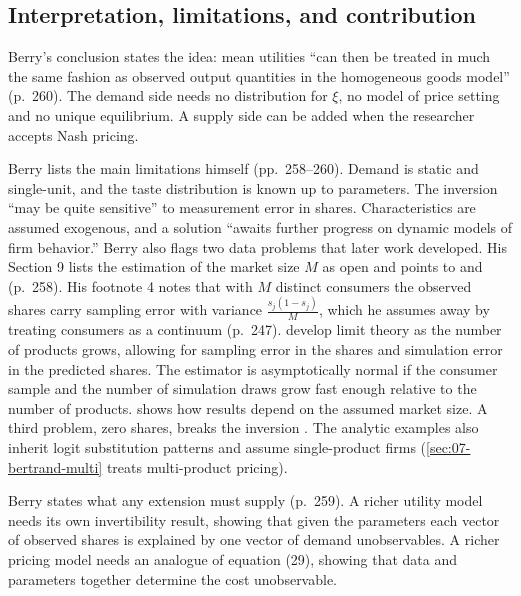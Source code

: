 \subsection{Interpretation, limitations, and contribution}\label{sec:07-berry-assessment}

Berry's conclusion states the idea: mean utilities ``can then be treated in much the same fashion as observed
output quantities in the homogeneous goods model'' (p.~260). The demand side needs no distribution for $\xi$, no
model of price setting and no unique equilibrium. A supply side can be added when the researcher accepts Nash
pricing.

Berry lists the main limitations himself (pp.~258--260). Demand is static and single-unit, and the taste
distribution is known up to parameters. The inversion ``may be quite sensitive'' to measurement error in shares.
Characteristics are assumed exogenous, and a solution ``awaits further progress on dynamic models of firm
behavior.'' Berry also flags two data problems that later work developed. His Section 9 lists the estimation of the
market size $M$ as open and points to \citet{Berry1990} and \citet{Greenstein1992} (p.~258). His footnote 4 notes
that with $M$ distinct consumers the observed shares carry sampling error with variance $\frac{s_j(1 - s_j)}{M}$,
which he assumes away by treating consumers as a continuum (p.~247).
\citet*{BerryLintonPakes2004} develop limit theory as the number of products grows, allowing for sampling error in
the shares and simulation error in the predicted shares. The estimator is asymptotically normal if the consumer sample
and the number of simulation draws grow fast enough relative to the number of products. 
shows how results depend on the assumed market size.
A third problem, zero shares, breaks the inversion \citep{GandhiLuShi2023}. The analytic examples also inherit logit
substitution patterns and assume single-product firms (\cref{sec:07-bertrand-multi} treats multi-product pricing).

Berry states what any extension must supply (p.~259). A richer utility model needs its own invertibility result,
showing that given the parameters each vector of observed shares is explained by one vector of demand
unobservables. A richer pricing model needs an analogue of equation (29), showing that data and parameters together
determine the cost unobservable.

